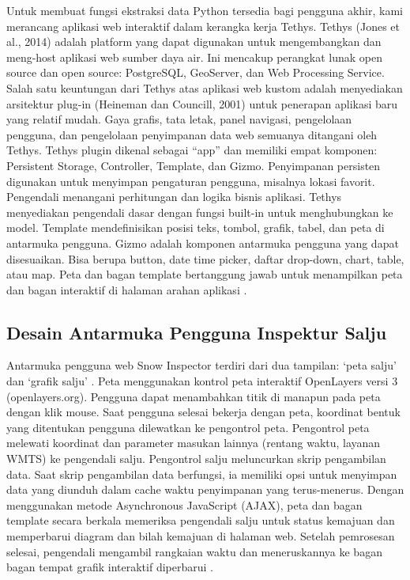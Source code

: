 Untuk membuat fungsi ekstraksi data Python tersedia bagi pengguna akhir, kami merancang aplikasi web interaktif dalam kerangka kerja 
Tethys. Tethys (Jones et al., 2014) adalah platform yang dapat digunakan untuk mengembangkan dan meng-host aplikasi web sumber daya air. 
Ini mencakup perangkat lunak open source dan open source: PostgreSQL, GeoServer, dan Web Processing Service. Salah satu keuntungan dari 
Tethys atas aplikasi web kustom adalah menyediakan arsitektur plug-in (Heineman dan Councill, 2001) untuk penerapan aplikasi baru yang 
relatif mudah. Gaya grafis, tata letak, panel navigasi, pengelolaan pengguna, dan pengelolaan penyimpanan data web semuanya ditangani 
oleh Tethys. Tethys plugin dikenal sebagai ``app'' dan memiliki empat komponen: Persistent Storage, Controller, Template, dan Gizmo. 
Penyimpanan persisten digunakan untuk menyimpan pengaturan pengguna, misalnya lokasi favorit. Pengendali menangani perhitungan dan 
logika bisnis aplikasi. Tethys menyediakan pengendali dasar dengan fungsi built-in untuk menghubungkan ke model. Template mendefinisikan 
posisi teks, tombol, grafik, tabel, dan peta di antarmuka pengguna. Gizmo adalah komponen antarmuka pengguna yang dapat disesuaikan. 
Bisa berupa button, date time picker, daftar drop-down, chart, table, atau map. Peta dan bagan template bertanggung jawab untuk 
menampilkan peta dan bagan interaktif di halaman arahan aplikasi \cite{Kadlec2016Extracting}. 



\subsection{Desain Antarmuka Pengguna Inspektur Salju}

 Antarmuka pengguna web Snow Inspector terdiri dari dua tampilan: `peta salju' dan `grafik salju' . Peta menggunakan kontrol peta interaktif OpenLayers versi 3 (openlayers.org). Pengguna dapat menambahkan titik di manapun pada peta dengan klik mouse. Saat pengguna selesai bekerja dengan peta, koordinat bentuk yang ditentukan pengguna dilewatkan ke pengontrol peta. Pengontrol peta melewati koordinat dan parameter masukan lainnya (rentang waktu, layanan WMTS) ke pengendali salju. Pengontrol salju meluncurkan skrip pengambilan data. Saat skrip pengambilan data berfungsi, ia memiliki opsi untuk menyimpan data yang diunduh dalam cache waktu penyimpanan yang terus-menerus. Dengan menggunakan metode Asynchronous JavaScript (AJAX), peta dan bagan template secara berkala memeriksa pengendali salju untuk status kemajuan dan memperbarui diagram dan bilah kemajuan di halaman web. Setelah pemrosesan selesai, pengendali mengambil rangkaian waktu dan meneruskannya ke bagan bagan tempat grafik interaktif diperbarui \cite{Kadlec2016Extracting}.



